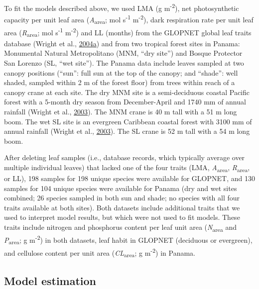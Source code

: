 \documentclass[12pt,]{article}
\theoremstyle{definition}
\theoremstyle{definition}
\theoremstyle{definition}
\theoremstyle{remark}
\begin{document}
To fit the models described above, we used LMA (g
m\textsuperscript{-2}), net photosynthetic capacity per unit leaf area
(\emph{A}\textsubscript{area}; mol s\textsuperscript{-1}
m\textsuperscript{-2}), dark respiration rate per unit leaf area
(\emph{R}\textsubscript{area}; mol s\textsuperscript{-1}
m\textsuperscript{-2}) and LL (months) from the GLOPNET global leaf
traits database (Wright et al.,
\protect\hyperlink{ref-Wright2004a}{2004}\protect\hyperlink{ref-Wright2004a}{a})
and from two tropical forest sites in Panama: Monumental Natural
Metropolitano (MNM, ``dry site'') and Bosque Protector San Lorenzo (SL,
``wet site''). The Panama data include leaves sampled at two canopy
positions (``sun'': full sun at the top of the canopy; and ``shade'':
well shaded, sampled within 2 m of the forest floor) from trees within
reach of a canopy crane at each site. The dry MNM site is a
semi-deciduous coastal Pacific forest with a 5-month dry season from
December-April and 1740 mm of annual rainfall (Wright et al.,
\protect\hyperlink{ref-Wright2003}{2003}). The MNM crane is 40 m tall
with a 51 m long boom. The wet SL site is an evergreen Caribbean coastal
forest with 3100 mm of annual rainfall (Wright et al.,
\protect\hyperlink{ref-Wright2003}{2003}). The SL crane is 52 m tall
with a 54 m long boom.

After deleting leaf samples (i.e., database records, which typically
average over multiple individual leaves) that lacked one of the four
traits (LMA, \emph{A}\textsubscript{area}, \emph{R}\textsubscript{area},
or LL), 198 samples for 198 unique species were available for GLOPNET,
and 130 samples for 104 unique species were available for Panama (dry
and wet sites combined; 26 species sampled in both sun and shade; no
species with all four traits available at both sites). Both datasets
include additional traits that we used to interpret model results, but
which were not used to fit models. These traits include nitrogen and
phosphorus content per leaf unit area (\emph{N}\textsubscript{area} and
\emph{P}\textsubscript{area}; g m\textsuperscript{-2}) in both datasets,
leaf habit in GLOPNET (deciduous or evergreen), and cellulose content
per unit area (\emph{CL}\textsubscript{area}; g m\textsuperscript{-2})
in Panama.

\hypertarget{model-estimation}{%
\subsection{Model estimation}\label{model-estimation}}
\end{document}
